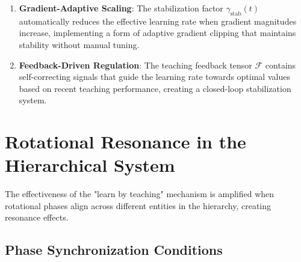 \begin{theorem}
\begin{enumerate}
    \item \textbf{Gradient-Adaptive Scaling}: The stabilization factor $\gamma_{\text{stab}}(t)$ automatically reduces the effective learning rate when gradient magnitudes increase, implementing a form of adaptive gradient clipping that maintains stability without manual tuning.
    
    \item \textbf{Feedback-Driven Regulation}: The teaching feedback tensor $\mathcal{F}$ contains self-correcting signals that guide the learning rate towards optimal values based on recent teaching performance, creating a closed-loop stabilization system.
\end{enumerate}
\end{theorem}

\section{Rotational Resonance in the Hierarchical System}

The effectiveness of the "learn by teaching" mechanism is amplified when rotational phases align across different entities in the hierarchy, creating resonance effects.

\subsection{Phase Synchronization Conditions}

